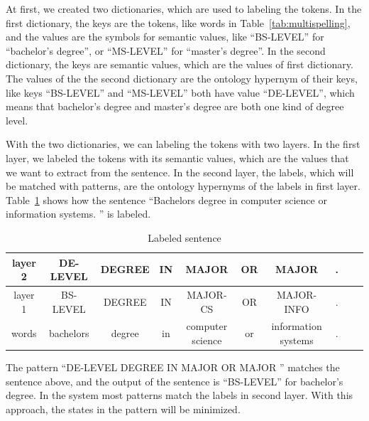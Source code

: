 At first, we created two dictionaries, which are used to labeling the tokens. In the first dictionary, the keys are the tokens, like words in Table~\ref{tab:multispelling}, and the values are the symbols for semantic values, like ``BS-LEVEL'' for ``bachelor's degree'', or ``MS-LEVEL'' for ``master's degree''. In the second dictionary, the keys are semantic values, which are the values of first dictionary. The values of the the second dictionary are the ontology hypernym of their keys, like keys ``BS-LEVEL'' and  ``MS-LEVEL'' both have value ``DE-LEVEL'', which means that bachelor's degree and master's degree are both one kind of degree level.

With the two dictionaries, we can labeling the tokens with two layers. In the first layer, we labeled the tokens with its semantic values, which are the values that we want to extract from the sentence. In the second layer, the labels, which will be matched with patterns, are the ontology hypernyms of the labels in first layer. Table~\ref{tab:labeldsent} shows how the sentence ``Bachelors  degree  in computer science or information systems. '' is labeled. 

\begin{table}[ht]
\caption{Labeled sentence } %
\centering %
\begin{tabular}{  | c | c | c | c | c |c | c |c | c | c |  }
 \hline
 layer 2 & DE-LEVEL   & DEGREE & IN & MAJOR            & OR & MAJOR  &.  \\
 \hline
 layer 1 &  BS-LEVEL   & DEGREE & IN & MAJOR-CS         & OR & MAJOR-INFO & .      \\
 \hline
   words & bachelors   & degree & in & computer science & or & information systems & .     \\
  \hline
\end{tabular}
\label{tab:labeldsent} %
\end{table}

The pattern ``DE-LEVEL DEGREE  IN   MAJOR  OR  MAJOR ''  matches the sentence above, and the output of the sentence is ``BS-LEVEL'' for bachelor's degree. In the system most patterns match the labels in second layer. With this approach, the states in the pattern will be minimized. 

